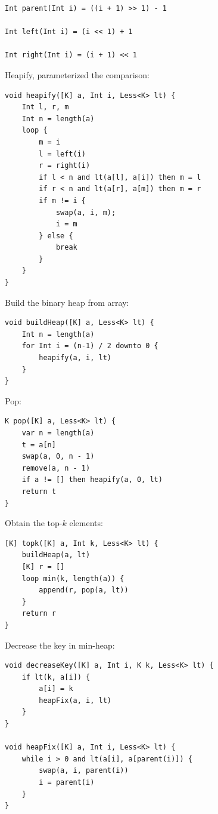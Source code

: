 \documentclass[b5paper]{article}
\begin{document}
\begin{lstlisting}[language = Bourbaki]
Int parent(Int i) = ((i + 1) >> 1) - 1

Int left(Int i) = (i << 1) + 1

Int right(Int i) = (i + 1) << 1
\end{lstlisting}

Heapify, parameterized the comparison:

\begin{lstlisting}[language = Bourbaki]
void heapify([K] a, Int i, Less<K> lt) {
    Int l, r, m
    Int n = length(a)
    loop {
        m = i
        l = left(i)
        r = right(i)
        if l < n and lt(a[l], a[i]) then m = l
        if r < n and lt(a[r], a[m]) then m = r
        if m != i {
            swap(a, i, m);
            i = m
        } else {
            break
        }
    }
}
\end{lstlisting}

Build the binary heap from array:

\begin{lstlisting}[language = Bourbaki]
void buildHeap([K] a, Less<K> lt) {
    Int n = length(a)
    for Int i = (n-1) / 2 downto 0 {
        heapify(a, i, lt)
    }
}
\end{lstlisting}

Pop:

\begin{lstlisting}[language = Bourbaki]
K pop([K] a, Less<K> lt) {
    var n = length(a)
    t = a[n]
    swap(a, 0, n - 1)
    remove(a, n - 1)
    if a != [] then heapify(a, 0, lt)
    return t
}
\end{lstlisting}

Obtain the top-$k$ elements:

\begin{lstlisting}[language = Bourbaki]
[K] topk([K] a, Int k, Less<K> lt) {
    buildHeap(a, lt)
    [K] r = []
    loop min(k, length(a)) {
        append(r, pop(a, lt))
    }
    return r
}
\end{lstlisting}

Decrease the key in min-heap:

\begin{lstlisting}[language = Bourbaki]
void decreaseKey([K] a, Int i, K k, Less<K> lt) {
    if lt(k, a[i]) {
        a[i] = k
        heapFix(a, i, lt)
    }
}

void heapFix([K] a, Int i, Less<K> lt) {
    while i > 0 and lt(a[i], a[parent(i)]) {
        swap(a, i, parent(i))
        i = parent(i)
    }
}
\end{lstlisting}
\end{document}
